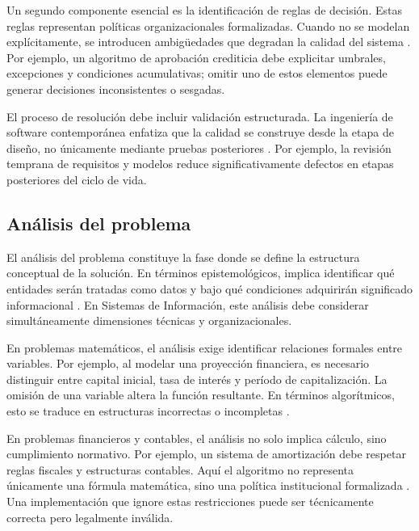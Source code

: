 \documentclass[12pt,twoside]{book}
\begin{document}
				Un segundo componente esencial es la identificación de reglas de decisión. Estas reglas representan políticas organizacionales formalizadas. Cuando no se modelan explícitamente, se introducen ambigüedades que degradan la calidad del sistema \cite{ISOIECIEEE2018Requirements}. Por ejemplo, un algoritmo de aprobación crediticia debe explicitar umbrales, excepciones y condiciones acumulativas; omitir uno de estos elementos puede generar decisiones inconsistentes o sesgadas.
				
				El proceso de resolución debe incluir validación estructurada. La ingeniería de software contemporánea enfatiza que la calidad se construye desde la etapa de diseño, no únicamente mediante pruebas posteriores \cite{Pressman2019Software,SWEBOK2025Guide}. Por ejemplo, la revisión temprana de requisitos y modelos reduce significativamente defectos en etapas posteriores del ciclo de vida.
				
			\subsection{Análisis del problema}
				\noindent
				El análisis del problema constituye la fase donde se define la estructura conceptual de la solución. En términos epistemológicos, implica identificar qué entidades serán tratadas como datos y bajo qué condiciones adquirirán significado informacional \cite{Floridi2003Data,Marchionini2023Information}. En Sistemas de Información, este análisis debe considerar simultáneamente dimensiones técnicas y organizacionales.
				
				En problemas matemáticos, el análisis exige identificar relaciones formales entre variables. Por ejemplo, al modelar una proyección financiera, es necesario distinguir entre capital inicial, tasa de interés y período de capitalización. La omisión de una variable altera la función resultante. En términos algorítmicos, esto se traduce en estructuras incorrectas o incompletas \cite{Chapra2014Numerical}.
				
				En problemas financieros y contables, el análisis no solo implica cálculo, sino cumplimiento normativo. Por ejemplo, un sistema de amortización debe respetar reglas fiscales y estructuras contables. Aquí el algoritmo no representa únicamente una fórmula matemática, sino una política institucional formalizada \cite{RodriguezCampillo2003Sistemas}. Una implementación que ignore estas restricciones puede ser técnicamente correcta pero legalmente inválida.
				
\end{document}
